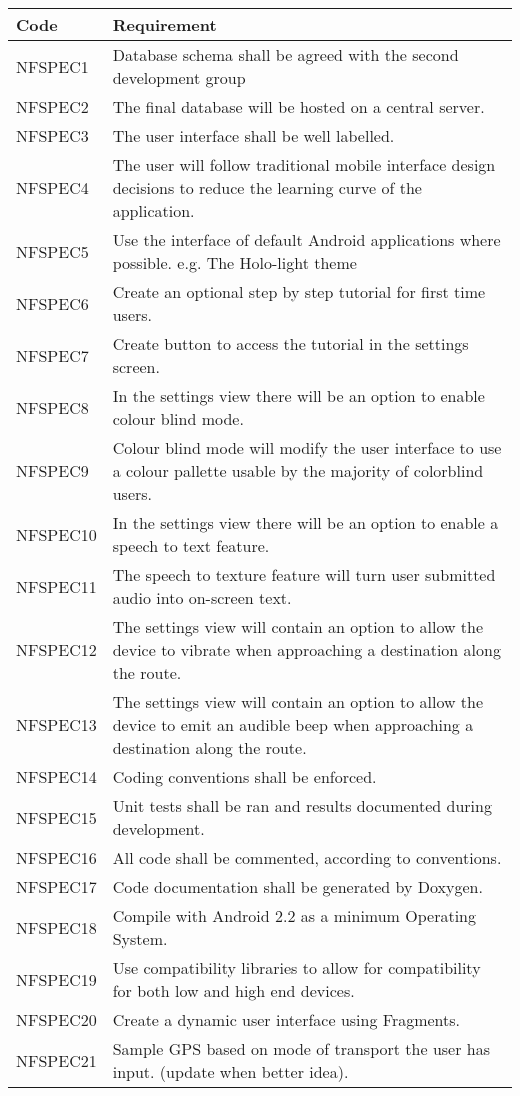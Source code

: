 \documentclass[11pt,a4paper]{article}
\begin{document}
\begin{longtable}{|p{2.5cm}p{13cm}|}
\hline
\textbf{Code} & \textbf{Requirement} \\

\hline
NFSPEC1 & Database schema shall be agreed with the second development group \\ \hline
NFSPEC2 & The final database will be hosted on a central server. \\ \hline
NFSPEC3 & The user interface shall be well labelled. \\ \hline
NFSPEC4 & The user will follow traditional mobile interface design decisions to reduce the learning curve of the application. \\ \hline
NFSPEC5 & Use the interface of default Android applications where possible. e.g. The Holo-light theme \\ \hline
NFSPEC6 & Create an optional step by step tutorial for first time users. \\ \hline
NFSPEC7 & Create button to access the tutorial in the settings screen. \\ \hline
NFSPEC8 & In the settings view there will be an option to enable colour blind mode. \\ \hline
NFSPEC9 & Colour blind mode will modify the user interface to use a colour pallette usable by the majority of colorblind users. \\ \hline
NFSPEC10 & In the settings view there will be an option to enable a speech to text feature. \\ \hline
NFSPEC11 & The speech to texture feature will turn user submitted audio into on-screen text. \\ \hline
NFSPEC12 & The settings view will contain an option to allow the device to vibrate when approaching a destination along the route. \\ \hline
NFSPEC13 & The settings view will contain an option to allow the device to emit an audible beep when approaching a destination along the route. \\ \hline
NFSPEC14 & Coding conventions shall be enforced. \\ \hline
NFSPEC15 & Unit tests shall be ran and results documented during development. \\ \hline
NFSPEC16 & All code shall be commented, according to conventions. \\ \hline
NFSPEC17 & Code documentation shall be generated by Doxygen. \\ \hline
NFSPEC18 & Compile with Android 2.2 as a minimum Operating System. \\ \hline
NFSPEC19 & Use compatibility libraries to allow for compatibility for both low and high end devices. \\ \hline
NFSPEC20 & Create a dynamic user interface using Fragments. \\ \hline
NFSPEC21 & Sample GPS based on mode of transport the user has input. (update when better idea). \\ \hline
\end{longtable}
\end{document}
